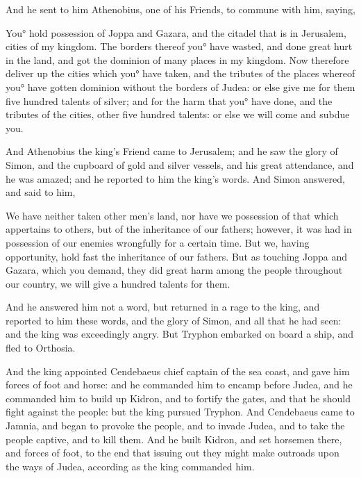{And he sent to him Athenobius, one of his
 Friends, to commune with him, saying,
\par }{\PP You° hold possession of Joppa and Gazara, and the citadel that is in Jerusalem, cities of my kingdom.
The borders thereof you° have wasted, and done great hurt in the land, and got the dominion of many places in my kingdom.
Now therefore deliver up the cities which you° have taken, and the tributes of the places whereof you° have gotten dominion without the borders of Judea:
or else give me for them five hundred talents of silver; and for the harm that you° have done, and the tributes of the cities, other five hundred talents: or else we will come and subdue you.
\par }{\PP {}And Athenobius the king’s
 Friend came to Jerusalem; and he saw the glory of Simon, and the cupboard of gold and silver vessels, and his great attendance, and he was amazed; and he reported to him the king’s words.
And Simon answered, and said to him,
\par }{\PP We have neither taken other men’s land, nor have we possession of that which appertains to others, but of the inheritance of our fathers; however, it was had in possession of our enemies wrongfully for a certain time.
But we, having opportunity, hold fast the inheritance of our fathers.
But as touching Joppa and Gazara, which you demand, they did great harm among the people throughout our country, we will give a hundred talents for them.
\par }{\PP And he answered him not a word,
but returned in a rage to the king, and reported to him these words, and the glory of Simon, and all that he had seen: and the king was exceedingly angry.
But Tryphon embarked on board a ship, and fled to Orthosia.
\par }{\PP {}And the king appointed Cendebaeus chief captain of the sea coast, and gave him forces of foot and horse:
and he commanded him to encamp before Judea, and he commanded him to build up Kidron, and to fortify the gates, and that he should fight against the people: but the king pursued Tryphon.
And Cendebaeus came to Jamnia, and began to provoke the people, and to invade Judea, and to take the people captive, and to kill them.
And he built Kidron, and set horsemen there, and forces of foot, to the end that issuing out they might make outroads upon the ways of Judea, according as the king commanded him.

}
